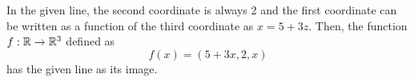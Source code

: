 
\begin{solution}
    In the given line, the second coordinate
    is always 2 and the first coordinate can be
    written as a function of the third coordinate
    as $x=5+3z$. Then, the function $f:\mathbb{R}\to\mathbb{R}^3$
    defined as
    $$f(x)=(5+3x,2,x)$$ has the given line as
    its image.
\end{solution}